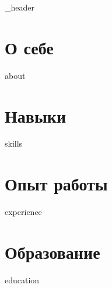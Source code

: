 \documentclass[letter,10pt]{article}
\author{Илья Казаков}
\begin{document}
{_header}
\vspace*{1pt}

\hline

\section{О себе}
\vspace*{3pt}
{about}
\vspace*{10pt}

\section{Навыки}
\vspace*{3pt}
{skills}
\vspace*{10pt}

\section{Опыт работы}
\vspace*{3pt}
{experience}
\vspace*{10pt}

\section{Образование}
{education}
\vspace*{10pt}
\end{document}
